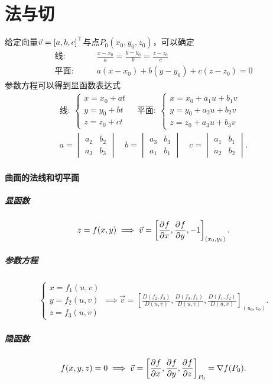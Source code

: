 \section{法与切}
给定向量$\vec v=\left[a,b,c\right]^\top$与点$P_0(x_0,y_0,z_0)$，可以确定
\begin{align*}
	\text{线}:   & \qquad \frac{x-x_0}a=\frac{y-y_0}b=\frac{z-z_0}c \\
	\text{平面}: & \qquad a(x-x_0)+b(y-y_0)+c(z-z_0)=0
\end{align*}
参数方程可以得到显函数表达式
\begin{gather*}
	\text{线}:~
	\begin{cases}
		x=x_0+at \\[-1ex]
		y=y_0+bt \\[-1ex]
		z=z_0+ct
	\end{cases}
	\quad
	\text{平面}:~
	\begin{cases}
		x=x_0+a_1u+b_1v \\[-1ex]
		y=y_0+a_2u+b_2v \\[-1ex]
		z=z_0+a_3u+b_3v
	\end{cases}
	\\
	a=
	\begin{vmatrix}
		a_2 & b_2 \\
		a_3 & b_3
	\end{vmatrix}\quad b=
	\begin{vmatrix}
		a_3 & b_3 \\
		a_1 & b_1
	\end{vmatrix}\quad c=
	\begin{vmatrix}
		a_1 & b_1 \\
		a_2 & b_2
	\end{vmatrix}.
\end{gather*}
\paragraph{曲面的法线和切平面}
\subparagraph{显函数}
\[
	z=f(x,y)\implies\vec v=\left[\frac{\partial^{{}}f}{\partial{x}^{{}}},\frac{\partial^{{}}f}{\partial{y}^{{}}},-1\right]_{(x_0,y_0)}.
\]
\subparagraph{参数方程}
\begin{align*}
	\begin{cases}
		x=f_1(u,v) \\
		y=f_2(u,v) \\
		z=f_3(u,v)
	\end{cases}
	\implies\vec v=\left[\frac{D(f_2,f_3)}{D(u,v)},\frac{D(f_3,f_1)}{D(u,v)},\frac{D(f_1,f_2)}{D(u,v)}\right]_{(u_0,v_0)}.
\end{align*}
\subparagraph{隐函数}
\[
	f(x,y,z)=0\implies\vec v=\left[\frac{\partial^{{}}f}{\partial{x}^{{}}},\frac{\partial^{{}}f}{\partial{y}^{{}}},\frac{\partial^{{}}f}{\partial{z}^{{}}}\right]_{P_0}=\nabla f(P_0).
\]
